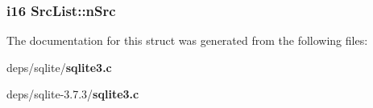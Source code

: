 \subsubsection{\setlength{\rightskip}{0pt plus 5cm}\bf{i16} \bf{Src\-List::n\-Src}}\label{structSrcList_7301263ca02dbd8a3430c95f257fe2e0}




The documentation for this struct was generated from the following files:\begin{CompactItemize}
\item 
deps/sqlite/\bf{sqlite3.c}\item 
deps/sqlite-3.7.3/\bf{sqlite3.c}\end{CompactItemize}

